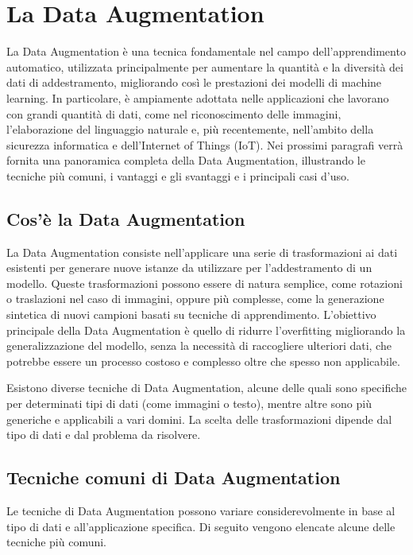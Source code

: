 \chapter{La Data Augmentation}

La Data Augmentation è una tecnica fondamentale nel campo dell’apprendimento automatico, utilizzata principalmente per aumentare la quantità e la diversità dei dati di addestramento, migliorando così le prestazioni dei modelli di machine learning. In particolare, è ampiamente adottata nelle applicazioni che lavorano con grandi quantità di dati, come nel riconoscimento delle immagini, l'elaborazione del linguaggio naturale e, più recentemente, nell’ambito della sicurezza informatica e dell'Internet of Things (IoT). Nei prossimi paragrafi verrà fornita una panoramica completa della Data Augmentation, illustrando le tecniche più comuni, i vantaggi e gli svantaggi e i principali casi d'uso.

\section{Cos'è la Data Augmentation}

La Data Augmentation consiste nell'applicare una serie di trasformazioni ai dati esistenti per generare nuove istanze da utilizzare per l'addestramento di un modello. Queste trasformazioni possono essere di natura semplice, come rotazioni o traslazioni nel caso di immagini, oppure più complesse, come la generazione sintetica di nuovi campioni basati su tecniche di apprendimento. L'obiettivo principale della Data Augmentation è quello di ridurre l'overfitting migliorando la generalizzazione del modello, senza la necessità di raccogliere ulteriori dati, che potrebbe essere un processo costoso e complesso oltre che spesso non applicabile.

Esistono diverse tecniche di Data Augmentation, alcune delle quali sono specifiche per determinati tipi di dati (come immagini o testo), mentre altre sono più generiche e applicabili a vari domini. La scelta delle trasformazioni dipende dal tipo di dati e dal problema da risolvere.\cite{dataAugmentation}

\section{Tecniche comuni di Data Augmentation}

Le tecniche di Data Augmentation possono variare considerevolmente in base al tipo di dati e all’applicazione specifica. Di seguito vengono elencate alcune delle tecniche più comuni.

